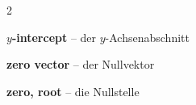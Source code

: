 \begin{multicols}{2}
\par\nopagebreak
\textbf{$y$-intercept} -- der $y$-Achsenabschnitt\dotfill\hyperref[e:121]{\pageref*{e:121}}\par

\par\nopagebreak
\textbf{zero vector} -- der Nullvektor\dotfill\hyperref[e:304]{\pageref*{e:304}}\par
\textbf{zero, root} -- die Nullstelle\dotfill\hyperref[e:122]{\pageref*{e:122}}\par
\end{multicols}


